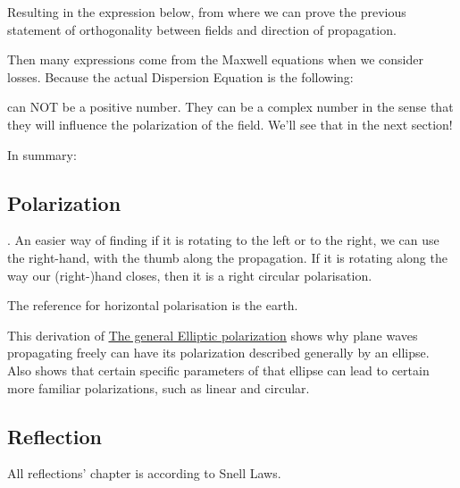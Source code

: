 Resulting in the expression below, from where we can prove the previous statement of orthogonality between fields and direction of propagation.


Then many expressions come from the Maxwell equations when we consider losses. Because the actual Dispersion Equation is the following:



 can NOT be a positive number. They can be a complex number in the sense that they will influence the polarization of the field. We'll see that in the next section!

In summary:


\subsection{Polarization}





. An easier way of finding if it is rotating to the left or to the right, we can use the right-hand, with the thumb along the propagation. If it is rotating along the way our (right-)hand closes, then it is a right circular polarisation. 

The reference for horizontal polarisation is the earth.


This derivation of \href{http://kestrel.nmt.edu/~mce/Polarization}{\ul{The general Elliptic polarization}} shows why plane waves propagating freely can have its polarization described generally by an ellipse. Also shows that certain specific parameters of that ellipse can lead to certain more familiar polarizations, such as linear and circular.



\subsection{Reflection}

All reflections' chapter is according to Snell Laws.

